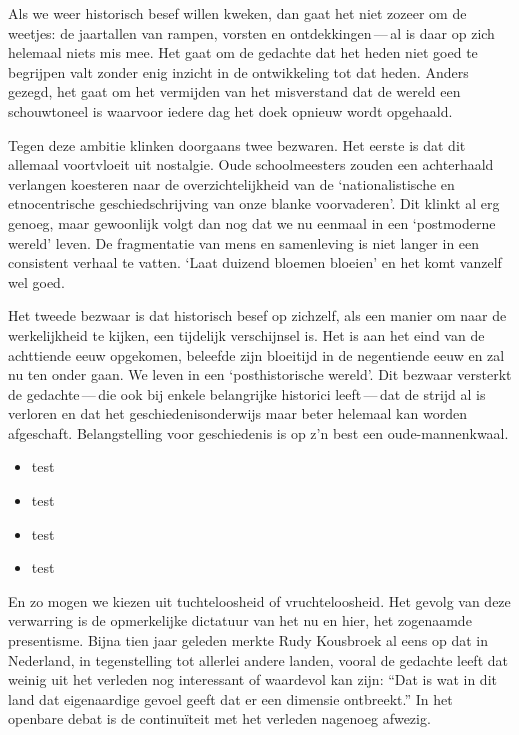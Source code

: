 \documentclass[12pt]{memoir}
\begin{document}
Als we weer historisch besef willen kweken, dan gaat het niet zozeer om de
weetjes: de jaartallen van rampen, vorsten en ontdekkingen\,---\,al is daar op
zich helemaal niets mis mee. Het gaat om de gedachte dat het heden
niet goed te begrijpen valt zonder enig inzicht in de ontwikkeling tot dat
heden. Anders gezegd, het gaat om het vermijden van het misverstand dat de
wereld een schouwtoneel is waarvoor iedere dag het doek opnieuw wordt opgehaald.

Tegen deze ambitie klinken doorgaans twee bezwaren. Het eerste is dat dit
allemaal voortvloeit uit nostalgie. Oude schoolmeesters zouden een achterhaald
verlangen koesteren naar de overzichtelijkheid van de `nationalistische en
etnocentrische geschiedschrijving van onze blanke voorvaderen'. Dit klinkt al
erg genoeg, maar gewoonlijk volgt dan nog dat we nu eenmaal in een `postmoderne
wereld' leven. De fragmentatie van mens en samenleving is niet langer in een
consistent verhaal te vatten. `Laat duizend bloemen bloeien' en het komt
vanzelf wel goed.

Het tweede bezwaar is dat historisch besef op zichzelf, als een manier om naar
de werkelijkheid te kijken, een tijdelijk verschijnsel is. Het is aan het eind
van de achttiende eeuw opgekomen, beleefde zijn bloeitijd in de negentiende eeuw
en zal nu ten onder gaan. We leven in een `posthistorische wereld'. Dit bezwaar
versterkt de gedachte\,---\,die ook bij enkele belangrijke historici
leeft\,---\,dat de strijd al is verloren en dat het geschiedenisonderwijs maar
beter helemaal kan worden afgeschaft. Belangstelling voor geschiedenis is op z'n
best een oude-mannenkwaal.

\begin{itemize}
\item test
\item test
\item test
\item test
\end{itemize}

En zo mogen we kiezen uit tuchteloosheid of vruchteloosheid. Het gevolg van deze
verwarring is de opmerkelijke dictatuur van het nu en hier, het zogenaamde
presentisme. Bijna tien jaar geleden merkte Rudy Kousbroek al eens op dat in
Nederland, in tegenstelling tot allerlei andere landen, vooral de gedachte leeft
dat weinig uit het verleden nog interessant of waardevol kan zijn: ``Dat is wat
in dit land dat eigenaardige gevoel geeft dat er een dimensie ontbreekt.'' In
het openbare debat is de continu\"iteit met het verleden nagenoeg afwezig.
\end{document}
